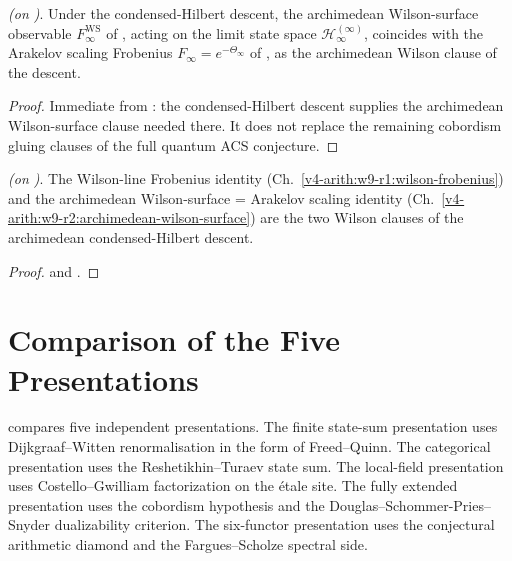 \begin{theorem}
\label{v4-arith:w10-a:thm:wilson-surface-compat}
\ClaimStatusProvedHereConditional \emph{(on
)}. Under the
condensed-Hilbert descent, the archimedean Wilson-surface
observable \(F_{\infty}^{\mathrm{WS}}\) of
, acting on the limit state
space \(\mathcal H^{(\infty)}_{\infty}\), coincides with the Arakelov
scaling Frobenius \(F_{\infty}=e^{-\Theta_{\infty}}\) of
, as the archimedean Wilson clause
of the descent.
\end{theorem}

\begin{proof}
Immediate from : the
condensed-Hilbert descent supplies the archimedean Wilson-surface
clause needed there. It does not replace the remaining cobordism
gluing clauses of the full quantum ACS conjecture.
\end{proof}

\begin{corollary}
\label{v4-arith:w10-a:cor:wilson-one-residual}
\ClaimStatusProvedHereConditional \emph{(on
)}. The Wilson-line Frobenius identity
(Ch.~\ref{v4-arith:w9-r1:wilson-frobenius}) and the archimedean
Wilson-surface = Arakelov scaling identity
(Ch.~\ref{v4-arith:w9-r2:archimedean-wilson-surface}) are the two
Wilson clauses of the archimedean condensed-Hilbert descent.
\end{corollary}

\begin{proof}
 and
.
\end{proof}

\section{Comparison of the Five Presentations}
\label{v4-arith:w10-a:ah:synthesis}

 compares five independent
presentations. The finite state-sum presentation uses
Dijkgraaf--Witten renormalisation in the form of Freed--Quinn. The
categorical presentation uses the Reshetikhin--Turaev state sum. The
local-field presentation uses Costello--Gwilliam factorization on the
\'etale site. The fully extended presentation uses the cobordism
hypothesis and the Douglas--Schommer-Pries--Snyder dualizability
criterion. The six-functor presentation uses the conjectural
arithmetic diamond and the Fargues--Scholze spectral side.

